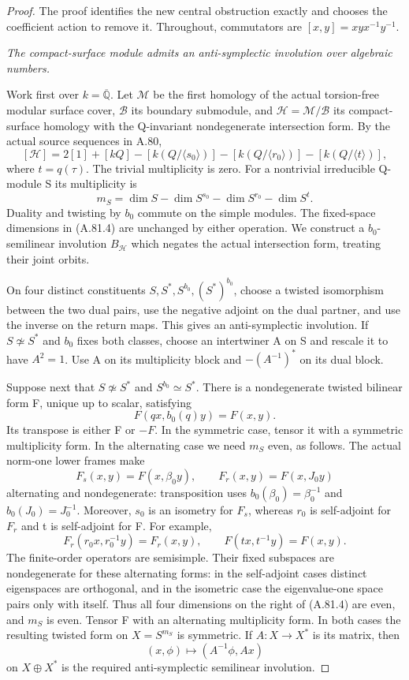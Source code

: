 \begin{proof}
The proof identifies the new central obstruction exactly and
chooses the coefficient action to remove it. Throughout,
commutators are \([x,y]=xyx^{-1}y^{-1}\).

\emph{The compact-surface module admits an anti-symplectic
involution over algebraic numbers.}\par
Work first over \(k=\overline{\mathbb Q}\). Let
\(\mathscr M\) be the first homology of the actual
torsion-free modular surface cover, \(\mathscr B\) its
boundary submodule, and
\(\mathscr H=\mathscr M/\mathscr B\) its compact-surface
homology with the Q-invariant nondegenerate intersection
form. By the actual source sequences in A.80,
\[
 [\mathscr H]=2[1]+[kQ]
 -[k(Q/\langle s_0\rangle)]-[k(Q/\langle r_0\rangle)]
 -[k(Q/\langle t\rangle)],
 \tag{A.81.3}
\]
where \(t=q(\tau)\). The trivial multiplicity is zero.
For a nontrivial irreducible Q-module S its multiplicity is
\[
 m_S=\dim S-\dim S^{s_0}-\dim S^{r_0}-\dim S^t.
 \tag{A.81.4}
\]
Duality and twisting by \(b_0\) commute on the simple
modules. The fixed-space dimensions in (A.81.4) are unchanged
by either operation. We construct a \(b_0\)-semilinear
involution \(B_{\mathscr H}\) which negates the actual
intersection form, treating their joint orbits.

On four distinct constituents \(S,S^*,S^{b_0},(S^*)^{b_0}\),
choose a twisted isomorphism between the two dual pairs,
use the negative adjoint on the dual partner, and use the
inverse on the return maps. This gives an anti-symplectic
involution. If \(S\not\simeq S^*\) and \(b_0\) fixes
both classes, choose an intertwiner A on S and rescale it
to have \(A^2=1\). Use A on its multiplicity block and
\(-(A^{-1})^*\) on its dual block.

Suppose next that \(S\not\simeq S^*\) and
\(S^{b_0}\simeq S^*\). There is a nondegenerate twisted
bilinear form F, unique up to scalar, satisfying
\[
                    F(qx,b_0(q)y)=F(x,y).
 \tag{A.81.5}
\]
Its transpose is either F or \(-F\). In the symmetric
case, tensor it with a symmetric multiplicity form. In the
alternating case we need \(m_S\) even, as follows.
The actual norm-one lower frames make
\[
 F_s(x,y)=F(x,\beta_0y),\qquad F_r(x,y)=F(x,J_0y)
 \tag{A.81.6}
\]
alternating and nondegenerate: transposition uses
\(b_0(\beta_0)=\beta_0^{-1}\) and
\(b_0(J_0)=J_0^{-1}\). Moreover, \(s_0\) is an
isometry for \(F_s\), whereas \(r_0\) is self-adjoint
for \(F_r\) and t is self-adjoint for F. For example,
\[
 F_r(r_0x,r_0^{-1}y)=F_r(x,y),\qquad
 F(tx,t^{-1}y)=F(x,y).
\]
The finite-order operators are semisimple. Their fixed
subspaces are nondegenerate for these alternating forms:
in the self-adjoint cases distinct eigenspaces are
orthogonal, and in the isometric case the eigenvalue-one
space pairs only with itself. Thus all four dimensions on
the right of (A.81.4) are even, and \(m_S\) is even.
Tensor F with an alternating multiplicity form. In both
cases the resulting twisted form on \(X=S^{m_S}\) is
symmetric. If \(A:X\to X^*\) is its matrix, then
\[
                     (x,\phi)\longmapsto(A^{-1}\phi,Ax)
 \tag{A.81.7}
\]
on \(X\oplus X^*\) is the required anti-symplectic
semilinear involution.


\end{proof}
